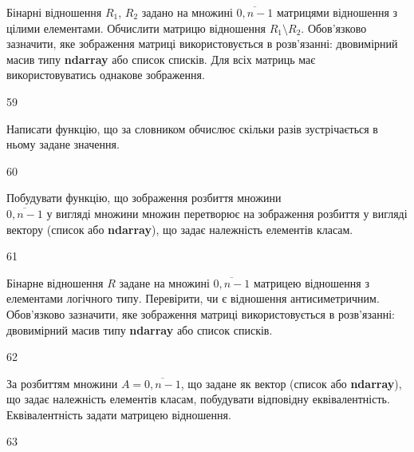Бінарні відношення $R_1$, $R_2$ задано на множині $\overline{0,n-1}$ матрицями відношення з цілими елементами. Обчислити матрицю відношення $R_1\setminus R_2$. Обов'язково зазначити, яке зображення матриці використовується в розв'язанні: двовимірний масив типу \textbf{ndarray} або список списків. Для всіх матриць має використовуватись однакове зображення.
\\\par
59 














Написати функцію, що за словником обчислює скільки разів зустрічається в ньому задане значення.
\\\par
60 














Побудувати функцію, що зображення розбиття множини\\ $\overline{0,n-1}$  у вигляді множини множин перетворює на зображення розбиття у вигляді вектору (список або  \textbf{ndarray}), що задає належність елементів класам.
\\\par
61 














Бінарне відношення $R$ задане на множині $\overline{0,n-1}$ матрицею відношення з елементами логічного типу. Перевірити, чи є відношення антисиметричним. Обов'язково зазначити, яке зображення матриці використовується в розв'язанні: двовимірний масив типу \textbf{ndarray} або список списків.
\\\par
62 














За розбиттям множини $A=\overline{0,n-1}$, що задане як вектор (список або  \textbf{ndarray}), що задає належність елементів класам, побудувати відповідну еквівалентність. Еквівалентність задати матрицею відношення.
\\\par
63 














